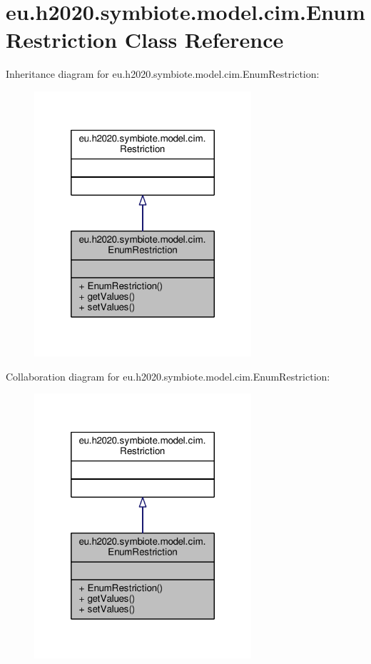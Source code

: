 \hypertarget{classeu_1_1h2020_1_1symbiote_1_1model_1_1cim_1_1EnumRestriction}{}\section{eu.\+h2020.\+symbiote.\+model.\+cim.\+Enum\+Restriction Class Reference}
\label{classeu_1_1h2020_1_1symbiote_1_1model_1_1cim_1_1EnumRestriction}


Inheritance diagram for eu.\+h2020.\+symbiote.\+model.\+cim.\+Enum\+Restriction\+:
\nopagebreak
\begin{figure}[H]
\begin{center}
\leavevmode
\includegraphics[width=228pt]{classeu_1_1h2020_1_1symbiote_1_1model_1_1cim_1_1EnumRestriction__inherit__graph}
\end{center}
\end{figure}


Collaboration diagram for eu.\+h2020.\+symbiote.\+model.\+cim.\+Enum\+Restriction\+:
\nopagebreak
\begin{figure}[H]
\begin{center}
\leavevmode
\includegraphics[width=228pt]{classeu_1_1h2020_1_1symbiote_1_1model_1_1cim_1_1EnumRestriction__coll__graph}
\end{center}
\end{figure}
